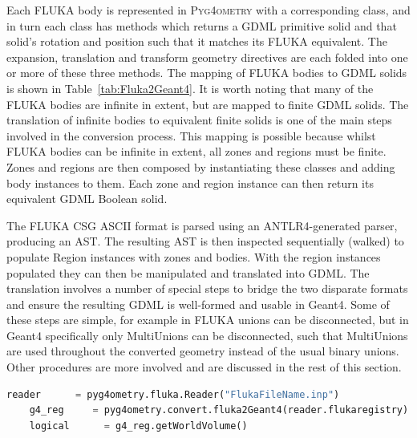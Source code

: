 \documentclass[final,5p,times,twocolumn]{elsarticle}
\newcommand{\PYGEOMETRY}{\textsc{Pyg4ometry}}
\begin{document}
Each FLUKA body is represented in \PYGEOMETRY{} with a corresponding
class, and in turn each class has methods which returns a GDML
primitive solid and that solid's rotation and position such that it
matches its FLUKA equivalent.  The expansion, translation and
transform geometry directives are each folded into one or more of
these three methods.  The mapping of FLUKA bodies to GDML solids is
shown in Table~\ref{tab:Fluka2Geant4}.  It is worth noting that many
of the FLUKA bodies are infinite in extent, but are mapped to finite
GDML solids.  The translation of infinite bodies to equivalent finite
solids is one of the main steps involved in the conversion process.
This mapping is possible because whilst FLUKA bodies can be infinite
in extent, all zones and regions must be finite.  Zones and regions
are then composed by instantiating these classes and adding body
instances to them.  Each zone and region instance can then return its
equivalent GDML Boolean solid.

The FLUKA CSG ASCII format is parsed using an ANTLR4-generated parser,
producing an AST.  The resulting AST is then inspected sequentially (walked)
to populate Region instances with zones and bodies.  With the region
instances populated they can then be manipulated and translated into GDML.
The translation involves a number of special steps to bridge the two
disparate formats and ensure the resulting GDML is well-formed and usable
in Geant4.  Some of these steps are simple, for example in FLUKA unions can
be disconnected, but in Geant4 specifically only MultiUnions can be
disconnected, such that MultiUnions are used throughout the converted
geometry instead of the usual binary unions.  Other procedures are more
involved and are discussed in the rest of this section.

\begin{lstlisting}[caption={A simple \PYGEOMETRY{} Python script to load a FLUKA file.},label={lst:pythonFlukaLoading}, language=Python]
    reader      = pyg4ometry.fluka.Reader("FlukaFileName.inp")
    g4_reg     = pyg4ometry.convert.fluka2Geant4(reader.flukaregistry)
    logical      = g4_reg.getWorldVolume()
\end{lstlisting}
\end{document}
